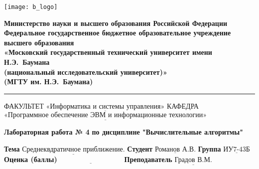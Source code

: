 \documentclass[a4paper,12pt]{article}
\begin{document}
\thispagestyle{empty}

\noindent \begin{minipage}{0.15\textwidth}
	\texttt{[image: b\_logo]}
\end{minipage}
\noindent\begin{minipage}{0.9\textwidth}\centering
	\textbf{Министерство науки и высшего образования Российской Федерации}\\
	\textbf{Федеральное государственное бюджетное образовательное учреждение высшего образования}\\
	\textbf{«Московский государственный технический университет имени Н.Э.~Баумана}\\
	\textbf{(национальный исследовательский университет)»}\\
	\textbf{(МГТУ им. Н.Э.~Баумана)}
\end{minipage}

\noindent\rule{18cm}{3pt}
\newline\newline
\noindent ФАКУЛЬТЕТ $\underline{\text{«Информатика и системы управления»}}$ \newline\newline
\noindent КАФЕДРА $\underline{\text{«Программное обеспечение ЭВМ и информационные технологии»}}$\newline\newline\newline\newline\newline\newline\newline


\begin{center}
	\noindent\begin{minipage}{1.3\textwidth}\centering
	\Large\textbf{  Лабораторная работа № 4}\newline
	\textbf{по дисциплине "Вычислительные алгоритмы"}\newline\newline\newline
	\end{minipage}
\end{center}

\noindent\textbf{Тема} $\underline{\text{Среднеквдратичное приближение.}}$\newline\newline
\noindent\textbf{Студент} $\underline{\text{Романов А.В.}}$\newline\newline
\noindent\textbf{Группа} $\underline{\text{ИУ7-43Б}}$\newline\newline
\noindent\textbf{Оценка (баллы)} $\underline{\text{~~~~~~~~~~~~~~~~~~~~~~~~~~~}}$\newline\newline
\noindent\textbf{Преподаватель} $\underline{\text{Градов В.М.}}$\newline
\end{document}

